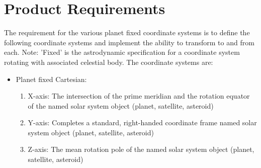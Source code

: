 \documentclass[twoside,11pt,titlepage]{report}
\begin{document}
\chapter{Product Requirements}\label{ch:reqt}
\label{reqt:pfix}
The requirement for the various planet fixed coordinate systems is to define the following coordinate systems and
implement the ability to transform to and from each. Note: 'Fixed' is the astrodynamic specification for a coordinate
system rotating with associated celestial body.
The coordinate systems are:
\label{reqt:pfixcart}\ \newline
\begin{itemize}
\item Planet fixed Cartesian:
\begin{enumerate}
\item X-axis: The intersection of the prime meridian and the rotation equator of the named solar system object (planet, satellite, asteroid)
\item Y-axis: Completes a standard, right-handed coordinate frame named solar system object (planet, satellite, asteroid)
\item Z-axis: The mean rotation pole of the named solar system object (planet, satellite, asteroid)
\end{enumerate}


\end{itemize}
\end{document}
